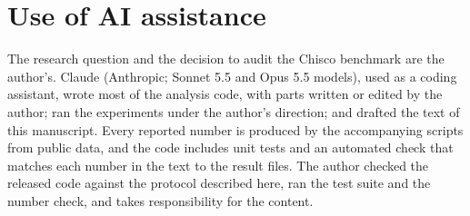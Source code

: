 \section*{Use of AI assistance}
The research question and the decision to audit the Chisco benchmark are the author's. Claude
(Anthropic; Sonnet 5.5 and Opus 5.5 models), used as a coding assistant, wrote most of the analysis
code, with parts written or edited by the author; ran the experiments under the author's direction;
and drafted the text of this manuscript. Every reported number is produced by the accompanying
scripts from public data, and the code includes unit tests and an automated check that matches each
number in the text to the result files.
The author checked the released code against the protocol described here, ran the test suite and
the number check, and takes responsibility for the content.
